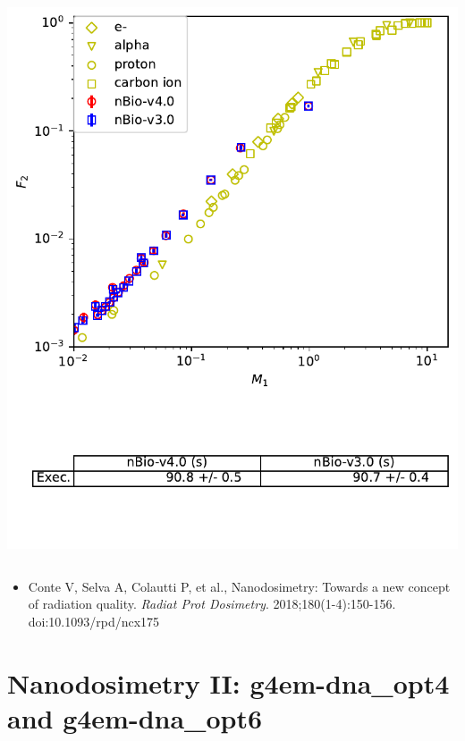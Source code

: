 \documentclass[aspectratio=1610]{beamer}
\begin{document}
\begin{frame}{\secname}
\begin{columns}
\begin{column}{0.4\linewidth}
     \includegraphics[width=\textwidth]{./NanodosimetryII/nanoII_opt2}
    \end{column}
   \end{columns}
\begin{itemize}
\item \tiny{Conte V, Selva A, Colautti P, et al., Nanodosimetry: Towards a new concept of radiation quality. \textit{Radiat Prot Dosimetry}. 2018;180(1-4):150-156. doi:10.1093/rpd/ncx175}
\end{itemize}
\end{frame}

\section{Nanodosimetry II: g4em-dna\_opt4 and g4em-dna\_opt6}
\end{document}
